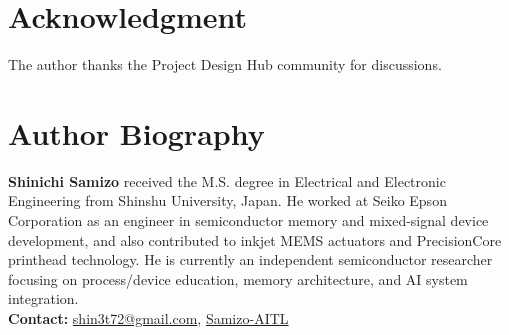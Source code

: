 \documentclass[conference]{IEEEtran}
\begin{document}
\section*{Acknowledgment}
The author thanks the Project Design Hub community for discussions.




\section*{Author Biography}
\noindent\textbf{Shinichi Samizo}
received the M.S. degree in Electrical and Electronic Engineering from Shinshu University, Japan.
He worked at Seiko Epson Corporation as an engineer in semiconductor memory and mixed-signal device development, and also contributed to inkjet MEMS actuators and PrecisionCore printhead technology.
He is currently an independent semiconductor researcher focusing on process/device education, memory architecture, and AI system integration.\\[2pt]
\textbf{Contact:} \href{mailto:shin3t72@gmail.com}{shin3t72@gmail.com}, \href{https://github.com/Samizo-AITL}{Samizo-AITL}
\end{document}
